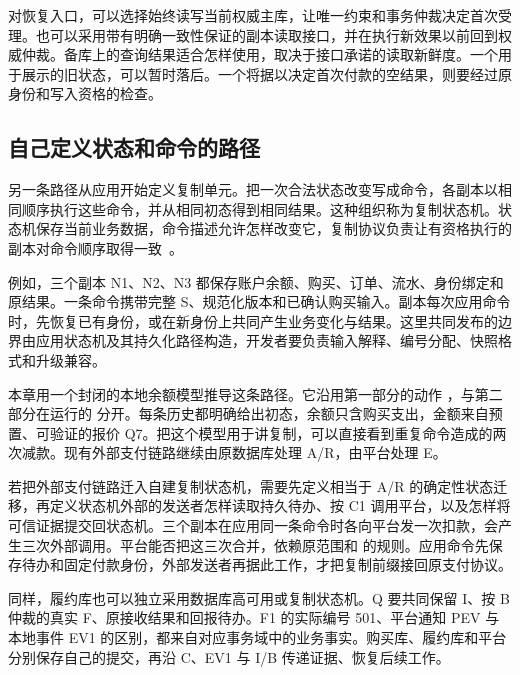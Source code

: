 对恢复入口，可以选择始终读写当前权威主库，让唯一约束和事务仲裁决定首次受理。也可以采用带有明确一致性保证的副本读取接口，并在执行新效果以前回到权威仲裁。备库上的查询结果适合怎样使用，取决于接口承诺的读取新鲜度。一个用于展示的旧状态，可以暂时落后。一个将据以决定首次付款的空结果，则要经过原身份和写入资格的检查。

\subsection*{自己定义状态和命令的路径}

另一条路径从应用开始定义复制单元。把一次合法状态改变写成命令，各副本以相同顺序执行这些命令，并从相同初态得到相同结果。这种组织称为复制状态机。状态机保存当前业务数据，命令描述允许怎样改变它，复制协议负责让有资格执行的副本对命令顺序取得一致~\cite{state-machine-approach}。

例如，三个副本 N1、N2、N3 都保存账户余额、购买、订单、流水、身份绑定和原结果。一条命令携带完整 S、规范化版本和已确认购买输入。副本每次应用命令时，先恢复已有身份，或在新身份上共同产生业务变化与结果。这里共同发布的边界由应用状态机及其持久化路径构造，开发者要负责输入解释、编号分配、快照格式和升级兼容。

本章用一个封闭的本地余额模型推导这条路径。它沿用第一部分的动作 ，与第二部分在运行的  分开。每条历史都明确给出初态，余额只含购买支出，金额来自预置、可验证的报价 Q7。把这个模型用于讲复制，可以直接看到重复命令造成的两次减款。现有外部支付链路继续由原数据库处理 A/R，由平台处理 E。


若把外部支付链路迁入自建复制状态机，需要先定义相当于 A/R 的确定性状态迁移，再定义状态机外部的发送者怎样读取持久待办、按 C1 调用平台，以及怎样将可信证据提交回状态机。三个副本在应用同一条命令时各向平台发一次扣款，会产生三次外部调用。平台能否把这三次合并，依赖原范围和  的规则。应用命令先保存待办和固定付款身份，外部发送者再据此工作，才把复制前缀接回原支付协议。

同样，履约库也可以独立采用数据库高可用或复制状态机。Q 要共同保留 I、按 B 仲裁的真实 F、原接收结果和回报待办。F1 的实际编号 501、平台通知 PEV 与本地事件 EV1 的区别，都来自对应事务域中的业务事实。购买库、履约库和平台分别保存自己的提交，再沿 C、EV1 与 I/B 传递证据、恢复后续工作。

\FloatBarrier
